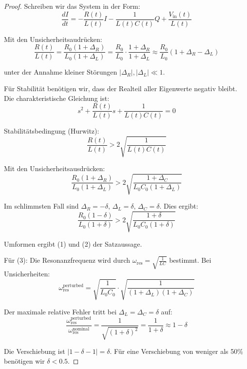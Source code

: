 \documentclass[a4paper, 12pt, twoside, openright]{report}
\theoremstyle{definition}
\theoremstyle{definition}
\begin{document}
\begin{proof}

Schreiben wir das System in der Form:
\begin{equation}
\frac{dI}{dt} = -\frac{R(t)}{L(t)} I - \frac{1}{L(t)C(t)} Q + \frac{V_{\text{in}}(t)}{L(t)}
\end{equation}

Mit den Unsicherheitsaudrücken:
\begin{equation}
\frac{R(t)}{L(t)} = \frac{R_0(1+\Delta_R)}{L_0(1+\Delta_L)} = \frac{R_0}{L_0} \cdot \frac{1+\Delta_R}{1+\Delta_L} \approx \frac{R_0}{L_0} (1 + \Delta_R - \Delta_L)
\end{equation}

unter der Annahme kleiner Störungen $|\Delta_R|, |\Delta_L| \ll 1$.

Für Stabilität benötigen wir, dass der Realteil aller Eigenwerte negativ bleibt. Die charakteristische Gleichung ist:
\begin{equation}
s^2 + \frac{R(t)}{L(t)} s + \frac{1}{L(t)C(t)} = 0
\end{equation}

Stabilitätsbedingung (Hurwitz): 
\begin{equation}
\frac{R(t)}{L(t)} > 2\sqrt{\frac{1}{L(t)C(t)}}
\end{equation}

Mit den Unsicherheitsausdrücken:
\begin{equation}
\frac{R_0(1+\Delta_R)}{L_0(1+\Delta_L)} > 2\sqrt{\frac{1+\Delta_C}{L_0 C_0(1+\Delta_L)}}
\end{equation}

Im schlimmsten Fall sind $\Delta_R = -\delta$, $\Delta_L = \delta$, $\Delta_C = \delta$. Dies ergibt:
\begin{equation}
\frac{R_0(1-\delta)}{L_0(1+\delta)} > 2\sqrt{\frac{1+\delta}{L_0 C_0(1+\delta)}}
\end{equation}

Umformen ergibt (1) und (2) der Satzaussage.

Für (3): Die Resonanzfrequenz wird durch $\omega_{\text{res}} = \sqrt{\frac{1}{LC}}$ bestimmt. Bei Unsicherheiten:
\begin{equation}
\omega_{\text{res}}^{\text{perturbed}} = \sqrt{\frac{1}{L_0 C_0}} \cdot \sqrt{\frac{1}{(1+\Delta_L)(1+\Delta_C)}}
\end{equation}

Der maximale relative Fehler tritt bei $\Delta_L = \Delta_C = \delta$ auf:
\begin{equation}
\frac{\omega_{\text{res}}^{\text{perturbed}}}{\omega_{\text{res}}^{\text{nominal}}} = \frac{1}{\sqrt{(1+\delta)^2}} = \frac{1}{1+\delta} \approx 1 - \delta
\end{equation}

Die Verschiebung ist $|1-\delta - 1| = \delta$. Für eine Verschiebung von weniger als 50\% benötigen wir $\delta < 0.5$.

\end{proof}
\end{document}
